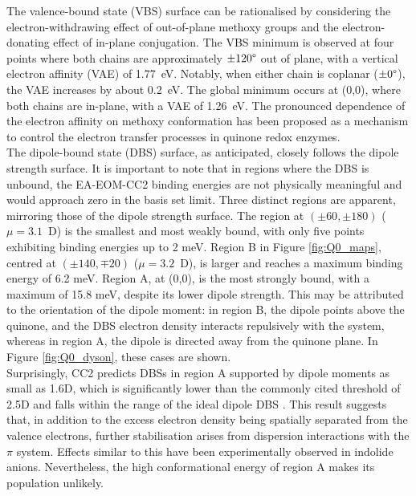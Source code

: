 The valence-bound state (VBS) surface can be rationalised by considering the electron-withdrawing effect of out-of-plane methoxy groups and the electron-donating effect of in-plane conjugation. The VBS minimum is observed at four points where both chains are approximately $\pm120\degree$ out of plane, with a vertical electron affinity (VAE) of 1.77~eV. Notably, when either chain is coplanar ($\pm0\degree$), the VAE increases by about 0.2~eV. The global minimum occurs at (0,0), where both chains are in-plane, with a VAE of 1.26~eV. The pronounced dependence of the electron affinity on methoxy conformation has been proposed as a mechanism to control the electron transfer processes in quinone redox enzymes\cite{schulz2018systematic,nonella1998quantum,taguchi2013tuning,taguchi2013conformational,deAlmeida2014effect}.\label{sec:Q0_maps}\\

The dipole-bound state (DBS) surface, as anticipated, closely follows the dipole strength surface. It is important to note that in regions where the DBS is unbound, the EA-EOM-CC2 binding energies are not physically meaningful and would approach zero in the basis set limit. Three distinct regions are apparent, mirroring those of the dipole strength surface. The region at $\mathrm{(\pm60,\pm180)}$ ($\mu=3.1$~D) is the smallest and most weakly bound, with only five points exhibiting binding energies up to 2 meV. Region B in Figure \ref{fig:Q0_maps}, centred at $\mathrm{(\pm140,\mp20)}$ ($\mu=3.2$~D), is larger and reaches a maximum binding energy of 6.2 meV. Region A, at (0,0), is the most strongly bound, with a maximum of 15.8 meV, despite its lower dipole strength. This may be attributed to the orientation of the dipole moment: in region B, the dipole points above the quinone, and the DBS electron density  interacts repulsively with the \textpi system, whereas in region A, the dipole is directed away from the quinone plane. In Figure \ref{fig:Q0_dyson}, these cases are shown.\\

Surprisingly, CC2 predicts DBSs in region A supported by dipole moments as small as 1.6D, which is significantly lower than the commonly cited threshold of 2.5D and falls within the range of the ideal dipole DBS \cite{jordan2003theory}. This result suggests that, in addition to the excess electron density being spatially separated from the valence electrons, further stabilisation arises from dispersion interactions with the $\pi$ system. Effects similar to this have been experimentally observed in indolide anions\cite{yuan2023observation}. Nevertheless, the high conformational energy of region A makes its population unlikely.\\

